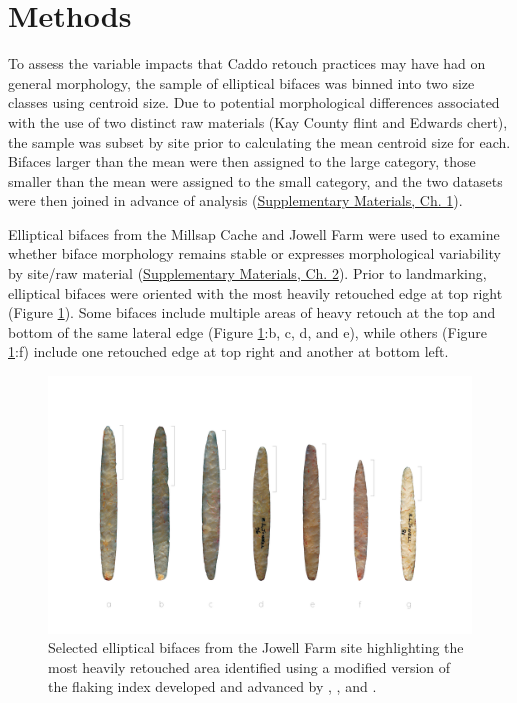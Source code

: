 \documentclass[]{interact}
\theoremstyle{plain}%
\theoremstyle{definition}
\theoremstyle{remark}
\begin{document}
\hypertarget{methods}{%
\section{Methods}\label{methods}}

To assess the variable impacts that Caddo retouch practices may have had
on general morphology, the sample of elliptical bifaces was binned into
two size classes using centroid size. Due to potential morphological
differences associated with the use of two distinct raw materials (Kay
County flint and Edwards chert), the sample was subset by site prior to
calculating the mean centroid size for each. Bifaces larger than the
mean were then assigned to the large category, those smaller than the
mean were assigned to the small category, and the two datasets were then
joined in advance of analysis
(\href{https://seldenlab.github.io/elliptical.bifaces/define-size-classes.html}{Supplementary
Materials, Ch. 1}).

Elliptical bifaces from the Millsap Cache and Jowell Farm were used to
examine whether biface morphology remains stable or expresses
morphological variability by site/raw material
(\href{https://seldenlab.github.io/elliptical.bifaces/gm---siteraw-material.html}{Supplementary
Materials, Ch. 2}). Prior to landmarking, elliptical bifaces were
oriented with the most heavily retouched edge at top right (Figure
\ref{fig:elliptical}). Some bifaces include multiple areas of heavy
retouch at the top and bottom of the same lateral edge (Figure
\ref{fig:elliptical}:b, c, d, and e), while others (Figure
\ref{fig:elliptical}:f) include one retouched edge at top right and
another at bottom left.

\begin{figure}\centering
\includegraphics[width=\linewidth]{figs/ellipticalbifaces.png}
\caption{Selected elliptical bifaces from the Jowell Farm site highlighting the most heavily retouched area identified using a modified version of the flaking index developed and advanced by \citet{RN11099}, \citet{RN9242}, and \citet{RN11098}.}
\label{fig:elliptical}
\end{figure}
\end{document}
